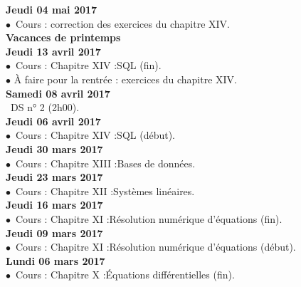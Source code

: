 \documentclass[12pt,a4paper]{article}
\begin{document}
\noindent\textbf{\bf Jeudi 04 mai 2017 \rm}\\
$\bullet$\ Cours : correction des exercices du chapitre XIV.
\vspace{.4cm}\\

\noindent\textbf{ Vacances de printemps \vspace{.4cm}}\\

\noindent\textbf{\bf Jeudi 13 avril 2017 \rm}\\
$\bullet$\ Cours : Chapitre XIV :\rm SQL (fin).\\
$\bullet$ À faire pour la rentrée : exercices du chapitre XIV.
\vspace{.4cm}\\


\noindent\textbf{\bf Samedi 08 avril 2017 \rm}\\
\bu\ DS n° 2 (2h00).\vspace{.4cm}\\

\noindent\textbf{\bf Jeudi 06 avril 2017 \rm}\\
$\bullet$\ Cours : Chapitre XIV :\rm SQL (début).
\vspace{.4cm}\\

\noindent\textbf{\bf Jeudi 30 mars 2017 \rm}\\
$\bullet$\ Cours : Chapitre XIII :\rm Bases de données.
\vspace{.4cm}\\

\noindent\textbf{\bf Jeudi 23 mars 2017 \rm}\\
$\bullet$\ Cours : Chapitre XII :\rm Systèmes linéaires.
\vspace{.4cm}\\

\noindent\textbf{\bf Jeudi 16 mars 2017 \rm}\\
$\bullet$\ Cours : Chapitre XI :\rm Résolution numérique d'équations (fin).
\vspace{.4cm}\\

\noindent\textbf{\bf Jeudi 09 mars 2017 \rm}\\
$\bullet$\ Cours : Chapitre XI :\rm Résolution numérique d'équations (début).
\vspace{.4cm}\\

\noindent\textbf{\bf Lundi 06 mars 2017 \rm}\\
$\bullet$\ Cours : Chapitre X :\rm Équations différentielles (fin).
\vspace{.4cm}\\
\end{document}
